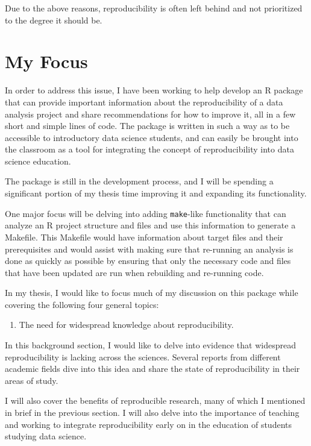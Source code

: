 \documentclass[12pt]{article}
\providecommand{\tightlist}{%
  \setlength{\itemsep}{0pt}\setlength{\parskip}{0pt}}
\begin{document}
Due to the above reasons, reproducibility is often left behind and not
prioritized to the degree it should be.

\section{My Focus}\label{my-focus}

In order to address this issue, I have been working to help develop an R
package that can provide important information about the reproducibility
of a data analysis project and share recommendations for how to improve
it, all in a few short and simple lines of code. The package is written
in such a way as to be accessible to introductory data science students,
and can easily be brought into the classroom as a tool for integrating
the concept of reproducibility into data science education.

The package is still in the development process, and I will be spending
a significant portion of my thesis time improving it and expanding its
functionality.

One major focus will be delving into adding \texttt{make}-like
functionality that can analyze an R project structure and files and use
this information to generate a Makefile. This Makefile would have
information about target files and their prerequisites and would assist
with making sure that re-running an analysis is done as quickly as
possible by ensuring that only the necessary code and files that have
been updated are run when rebuilding and re-running code.

In my thesis, I would like to focus much of my discussion on this
package while covering the following four general topics:

\begin{enumerate}
\def\labelenumi{\arabic{enumi})}
\tightlist
\item
  The need for widespread knowledge about reproducibility.
\end{enumerate}

In this background section, I would like to delve into evidence that
widespread reproducibility is lacking across the sciences. Several
reports from different academic fields dive into this idea and share the
state of reproducibility in their areas of study.

I will also cover the benefits of reproducible research, many of which I
mentioned in brief in the previous section. I will also delve into the
importance of teaching and working to integrate reproducibility early on
in the education of students studying data science.
\end{document}
